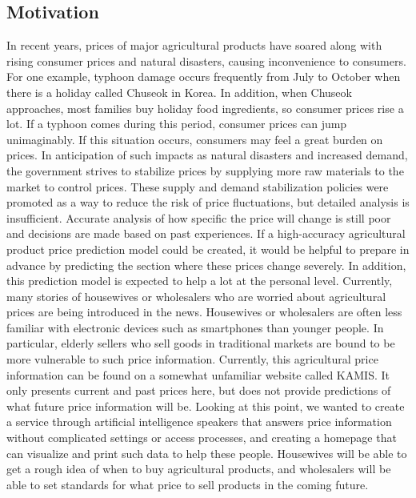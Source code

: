 \documentclass[conference]{IEEEtran}
\begin{document}
\subsection{Motivation}
    In recent years, prices of major agricultural products have soared along with rising consumer prices and natural disasters, causing inconvenience to consumers. For one example, typhoon damage occurs frequently from July to October when there is a holiday called Chuseok in Korea. In addition, when Chuseok approaches, most families buy holiday food ingredients, so consumer prices rise a lot. If a typhoon comes during this period, consumer prices can jump unimaginably. If this situation occurs, consumers may feel a great burden on prices. In anticipation of such impacts as natural disasters and increased demand, the government strives to stabilize prices by supplying more raw materials to the market to control prices. These supply and demand stabilization policies were promoted as a way to reduce the risk of price fluctuations, but detailed analysis is insufficient. Accurate analysis of how specific the price will change is still poor and decisions are made based on past experiences. If a high-accuracy agricultural product price prediction model could be created, it would be helpful to prepare in advance by predicting the section where these prices change severely.
    In addition, this prediction model is expected to help a lot at the personal level. Currently, many stories of housewives or wholesalers who are worried about agricultural prices are being introduced in the news. Housewives or wholesalers are often less familiar with electronic devices such as smartphones than younger people. In particular, elderly sellers who sell goods in traditional markets are bound to be more vulnerable to such price information. Currently, this agricultural price information can be found on a somewhat unfamiliar website called KAMIS. It only presents current and past prices here, but does not provide predictions of what future price information will be. Looking at this point, we wanted to create a service through artificial intelligence speakers that answers price information without complicated settings or access processes, and creating a homepage that can visualize and print such data to help these people. Housewives will be able to get a rough idea of when to buy agricultural products, and wholesalers will be able to set standards for what price to sell products in the coming future.
\end{document}
